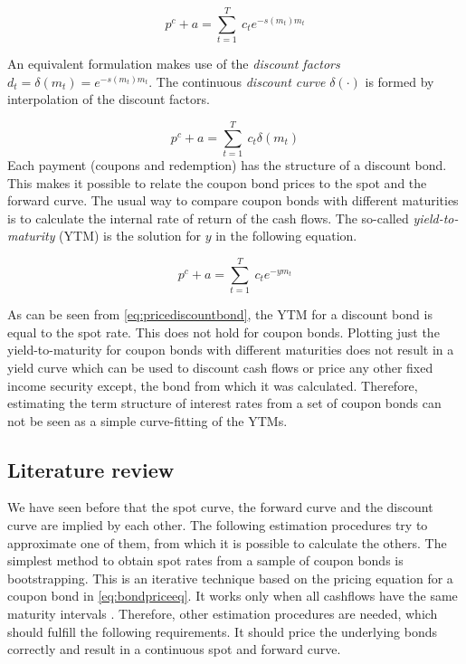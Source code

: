 \begin{equation}
  \label{eq:bondpriceeq}
  p^c+a = \sum_{t=1}^T \ c_t e^{-s(m_t)m_t}
\end{equation}

An equivalent formulation makes use of the \emph{discount factors} $d_t=\delta(m_t)=e^{-s(m_t)m_t}$. The continuous \emph{discount curve} $\delta(\cdot)$ is formed by interpolation of the discount factors.


\begin{equation*}
  \label{bondprceq2}
  p^c+a=\sum_{t=1}^T \ c_t \delta(m_t) 
\end{equation*}
Each payment (coupons and redemption) has the structure of a discount bond. This makes it possible to relate the coupon bond prices to the spot and the forward curve. The usual way to compare coupon bonds with different maturities is to calculate the internal rate of return of the cash flows. The so-called \emph{yield-to-maturity} (YTM) is the solution for $y$ in the following equation.

\begin{equation}
   \label{eq:yield}
   p^c+a=\sum_{t=1}^T \ c_t e^{-ym_t}
 \end{equation}

As can be seen from \eqref{eq:pricediscountbond}, the YTM for a discount bond is equal to the spot rate. This does not hold for coupon bonds. Plotting just the yield-to-maturity for coupon bonds with different maturities does not result in a yield curve which can be used to discount cash flows or price any other fixed income security except, the bond from which it was calculated. Therefore, estimating the term structure of interest rates from a set of coupon bonds can not be seen as a simple curve-fitting of the YTMs.

\subsection{Literature review}

We have seen before that the spot curve, the forward curve and the discount curve are implied by each other. The following estimation procedures try to approximate one of them, from which it is possible to calculate the others. The simplest method to obtain spot rates from a sample of coupon bonds is bootstrapping. This is an iterative technique based on the pricing equation for a coupon bond in \eqref{eq:bondpriceeq}. It works only when all cashflows have the same maturity intervals \citep[see, e.g.][]{Hagan2006}. Therefore, other estimation procedures are needed, which should fulfill the following requirements. It should price the underlying bonds correctly and result in a continuous spot and forward curve. 

